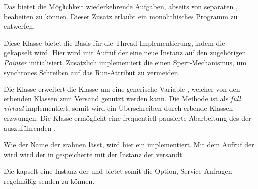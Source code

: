 
Das  bietet die Möglichkeit wiederkehrende Aufgaben, abseits von separaten \Node[s], beabeiten zu können. Dieser Zusatz erlaubt ein monolithisches Programm zu entwerfen.


Diese Klasse bietet die Basis für die Thread-Implementierung, indem die  gekapselt wird. Hier wird mit Aufruf der  eine neue Instanz auf den zugehörigen \textit{Pointer} initialisiert. Zusätzlich implementiert die  einen Sperr-Mechanismus, um synchrones Schreiben auf das Run-Attribut zu vermeiden.


Die Klasse  erweitert die Klasse  um eine generische Variable , welcher von den erbenden Klassen zum Versand genutzt werden kann. Die Methode  ist als \textit{full virtual} implementiert, somit wird ein Überschreiben durch erbende Klassen erzwungen. Die Klasse  ermöglicht eine frequentiell pausierte Abarbeitung des der auszuführenden .



Wie der Name der  erahnen lässt, wird hier ein  implementiert. Mit dem Aufruf der  wird wird der in  gespeicherte  mit der Instanz der  versandt.


Die  kapselt eine Instanz der  und bietet somit die Option, Service-Anfragen regelmäßig senden zu können.